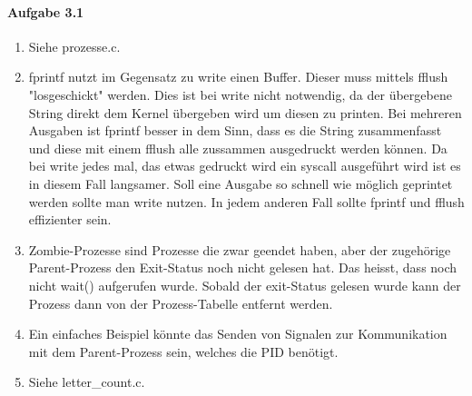 \documentclass[11pt]{article}
\begin{document}

\paragraph{Aufgabe 3.1}
\begin{enumerate}[label=\alph*)]
\item Siehe prozesse.c.

\item fprintf nutzt im Gegensatz zu write einen Buffer. Dieser muss mittels fflush "losgeschickt" werden. Dies ist bei write nicht notwendig, da der übergebene String direkt dem Kernel übergeben wird um diesen zu printen. Bei mehreren Ausgaben ist fprintf besser in dem Sinn, dass es die String zusammenfasst und diese mit einem fflush alle zussammen ausgedruckt werden können. Da bei write jedes mal, das etwas gedruckt wird ein syscall ausgeführt wird ist es in diesem Fall langsamer. Soll eine Ausgabe so schnell wie möglich geprintet werden sollte man write nutzen. In jedem anderen Fall sollte fprintf und fflush effizienter sein.

\item Zombie-Prozesse sind Prozesse die zwar geendet haben, aber der zugehörige Parent-Prozess den Exit-Status noch nicht gelesen hat. Das heisst, dass noch nicht wait() aufgerufen wurde. Sobald der exit-Status gelesen wurde kann der Prozess dann von der Prozess-Tabelle entfernt werden.

\item Ein einfaches Beispiel könnte das Senden von Signalen zur Kommunikation mit dem Parent-Prozess sein, welches die PID benötigt.

\item Siehe letter\_count.c.
\end{enumerate}
\end{document}
